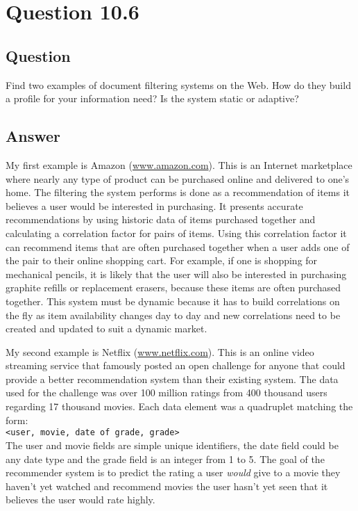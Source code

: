 \section{Question 10.6}

\subsection{Question}
Find two examples of document filtering systems on the Web. How do they build a profile for your information need? Is the system static or adaptive?

\subsection{Answer}
My first example is Amazon (\url{www.amazon.com}).  This is an Internet marketplace where nearly any type of product can be purchased online and delivered to one's home.  The filtering the system performs is done as a recommendation of items it believes a user would be interested in purchasing.  It presents accurate recommendations by using historic data of items purchased together and calculating a correlation factor for pairs of items.  Using this correlation factor it can recommend items that are often purchased together when a user adds one of the pair to their online shopping cart.  For example, if one is shopping for mechanical pencils, it is likely that the user will also be interested in purchasing graphite refills or replacement erasers, because these items are often purchased together.  This system must be dynamic because it has to build correlations on the fly as item availability changes day to day and new correlations need to be created and updated to suit a dynamic market.

My second example is Netflix (\url{www.netflix.com}).  This is an online video streaming service that famously posted an open challenge for anyone that could provide a better recommendation system than their existing system.  The data used for the challenge was over 100 million ratings from 400 thousand users regarding 17 thousand movies.  Each data element was a quadruplet matching the form:\\

\texttt{<user, movie, date of grade, grade>}\\

The user and movie fields are simple unique identifiers, the date field could be any date type and the grade field is an integer from 1 to 5.  The goal of the recommender system is to predict the rating a user \textit{would} give to a movie they haven't yet watched and recommend movies the user hasn't yet seen that it believes the user would rate highly. 


